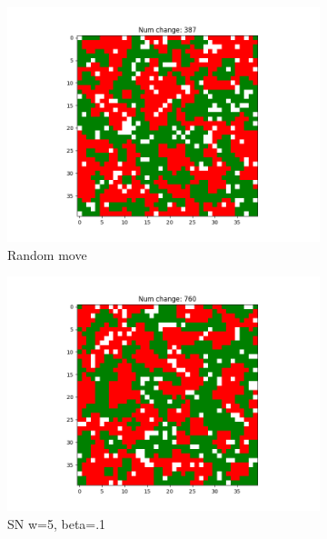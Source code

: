 \documentclass[11pt]{article}
\begin{document}
	\begin{figure}[h]
		\centering
		\begin{subfigure}{0.14\textwidth}
			\includegraphics[width=\linewidth]{final_random.png}
			\caption{\centering Random move}
			\label{sn_finalrandom}
		\end{subfigure}\hfill
		\begin{subfigure}{0.14\textwidth}
			\includegraphics[width=\linewidth]{final_cluster_w5b10.png}
			\caption{\centering SN w=5, beta=.1}
			\label{sn_finalw5b10}
		\end{subfigure}\hfill
		\begin{subfigure}{0.14\textwidth}

\end{subfigure}
\end{figure}
\end{document}
